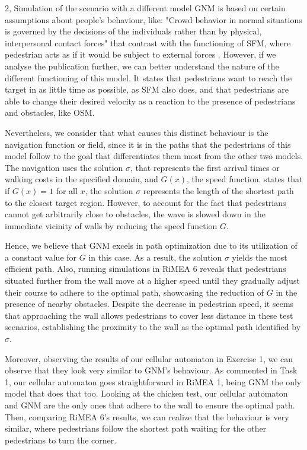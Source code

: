 \begin{task}{2, Simulation of the scenario with a different model}
GNM is based on certain assumptions about people's behaviour, like: "Crowd behavior in normal situations is governed by the decisions of the
individuals rather than by physical, interpersonal contact forces" that contrast with the functioning of SFM, where pedestrian acts as if it would be subject to external forces \cite{dietrich2014gradient}. However, if we analyse the publication further, we can better understand the nature of the different functioning of this model. It states that pedestrians want to reach the target in as little time as possible, as SFM also does, and that pedestrians are able to change their desired velocity as a reaction to the presence of pedestrians and obstacles, like OSM. 

Nevertheless, we consider that what causes this distinct behaviour is the navigation function or field, since it is in the paths that the pedestrians of this model follow to the goal that differentiates them most from the other two models. The navigation uses the solution $\sigma$, that represents the first arrival times or walking costs in the specified domain, and $G(x)$, the speed function. \cite{dietrich2014gradient} states that if $G(x)=1$ for all $x$, the solution $\sigma$ represents the length of the shortest path to the closest target region. However, to account for the fact that pedestrians cannot get arbitrarily close to obstacles, the wave is slowed down in the immediate vicinity of walls by reducing the speed function $G$. 

Hence, we believe that GNM excels in path optimization due to its utilization of a constant value for $G$ in this case. As a result, the solution $\sigma$ yields the most efficient path. Also, running simulations in RiMEA 6 reveals that pedestrians situated further from the wall move at a higher speed until they gradually adjust their course to adhere to the optimal path, showcasing the reduction of $G$ in the presence of nearby obstacles. Despite the decrease in pedestrian speed, it seems that approaching the wall allows pedestrians to cover less distance in these test scenarios, establishing the proximity to the wall as the optimal path identified by $\sigma$.



Moreover, observing the results of our cellular automaton in Exercise 1, we can observe that they look very similar to GNM's behaviour. As commented in Task 1, our cellular automaton goes straightforward in RiMEA 1, being GNM the only model that does that too. Looking at the chicken test, our cellular automaton and GNM are the only ones that adhere to the wall to ensure the optimal path. Then, comparing RiMEA 6's results, we can realize that the behaviour is very similar, where pedestrians follow the shortest path waiting for the other pedestrians to turn the corner. 




\end{task}

